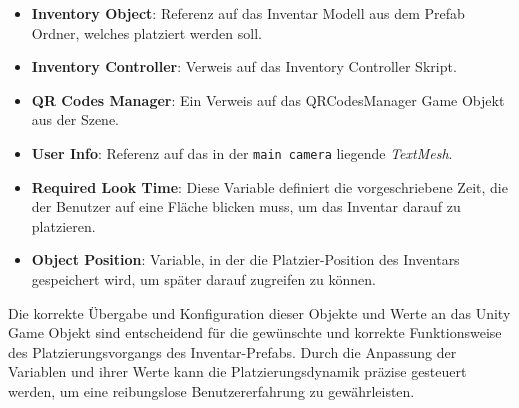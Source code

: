 \begin{itemize}
\begin{itemize}
    \item \textbf{Inventory Object}: Referenz auf das Inventar Modell aus dem Prefab Ordner, welches platziert werden soll.

    \item \textbf{Inventory Controller}: Verweis auf das Inventory Controller Skript.

    \item \textbf{QR Codes Manager}: Ein Verweis auf das QRCodesManager Game Objekt aus der Szene.

    \item \textbf{User Info}: Referenz auf das in der \texttt{main camera} liegende \textit{TextMesh}.

    \item \textbf{Required Look Time}: Diese Variable definiert die vorgeschriebene Zeit, die der Benutzer auf eine
    Fläche blicken muss, um das Inventar darauf zu platzieren.

    \item \textbf{Object Position}: Variable, in der die Platzier-Position des Inventars gespeichert wird, um später
    darauf zugreifen zu können.
\end{itemize}

Die korrekte Übergabe und Konfiguration dieser Objekte und Werte an das Unity Game Objekt sind entscheidend für die
gewünschte und korrekte Funktionsweise des Platzierungsvorgangs des Inventar-Prefabs. Durch die Anpassung der Variablen
und ihrer Werte kann die Platzierungsdynamik präzise gesteuert werden, um eine reibungslose Benutzererfahrung zu gewährleisten.


\end{itemize}
